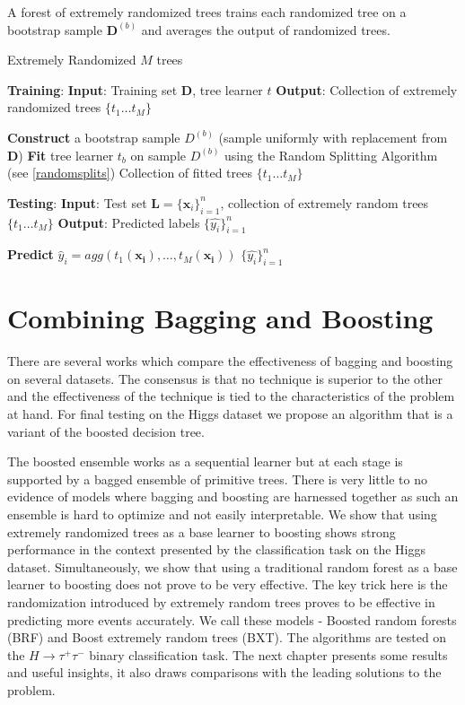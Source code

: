 A forest of extremely randomized trees trains each randomized tree on a bootstrap sample $\mathbf{D}^{(b)}$ and averages the output of randomized trees.
\begin{algorithm}[H]
\caption{Extremely Randomized $M$ trees}
\begin{algorithmic}[1]
\STATE \textbf{Training}:
\STATE \textbf{Input}: Training set $\mathbf{D}$, tree learner $t$ 
\STATE \textbf{Output}: Collection of extremely randomized trees $\{t_{1} \ldots t_{M}\}$
\item[]
\STATE \textbf{Construct} a bootstrap sample ${D^{(b)}}$ (sample uniformly with replacement from $\mathbf{D}$)
\STATE \textbf{Fit} tree learner $t_{b}$ on sample $D^{(b)}$ using the Random Splitting Algorithm (see \ref{randomsplits})
\ENDFOR
\RETURN Collection of fitted trees $\{t_{1} \ldots t_{M}\}$  
\item[]
\STATE \textbf{Testing}:
\STATE \textbf{Input}: Test set $\mathbf{L} = \{\mathbf{x}_{i}\}_{i=1}^{n}$, collection of extremely random trees $\{t_{1} \ldots t_{M}\}$ 
\STATE \textbf{Output}: Predicted labels $\{\hat{y_{i}}\}_{i=1}^{n}$ 
\item[]
\STATE \textbf{Predict} $\hat{y}_{i} = agg(t_{1}(\mathbf{x_{i}}), \ldots, t_{M}(\mathbf{x_{i}}))$
\ENDFOR
\RETURN $\{\hat{y_{i}}\}_{i=1}^{n}$
\end{algorithmic}
\label{eforest}
\end{algorithm}

\section{Combining Bagging and Boosting} 
\label{comb}

There are several works which compare the effectiveness of bagging and boosting on several datasets. The consensus is that no technique is superior to the other and the effectiveness of the technique is tied to the characteristics of the problem at hand. For final testing on the Higgs dataset we propose an algorithm that is a variant of the boosted decision tree.  

The boosted ensemble works as a sequential learner but at each stage is supported by a bagged ensemble of primitive trees. There is very little to no evidence of models where bagging and boosting are harnessed together as such an ensemble is hard to optimize and not easily interpretable. We show that using extremely randomized trees as a base learner to boosting shows strong performance in the context presented by the classification task on the Higgs dataset. Simultaneously, we show that using a traditional random forest as a base learner to boosting does not prove to be very effective. The key trick here is the randomization introduced by extremely random trees proves to be effective in predicting more events accurately. We call these models - Boosted random forests (\gls{BRF}) and Boost extremely random trees (\gls{BXT}). The algorithms are tested on the $H \rightarrow \tau^{+} \tau^{-}$ binary classification task. The next chapter presents some results and useful insights, it also draws comparisons with the leading solutions to the problem. 

